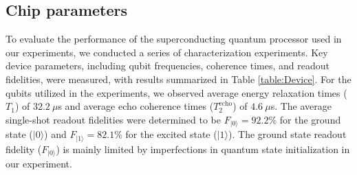 \documentclass[aps,prl,epsfigure,twocolumn,superscriptaddress]{revtex4-2}
\newcommand{\1}{\mathbbm{1}}
\begin{document}
\subsection{Chip parameters}

To evaluate the performance of the superconducting quantum processor used in our experiments, we conducted a series of characterization experiments. Key device parameters, including qubit frequencies, coherence times, and readout fidelities, were measured, with results summarized in Table \ref{table:Device}. For the qubits utilized in the experiments, we observed average energy relaxation times ($T_1$) of $32.2~\mu$s and average echo coherence times ($T_2^{\text{echo}}$) of $4.6~\mu$s. The average single-shot readout fidelities were determined to be $F_{|0\rangle} = 92.2\%$ for the ground state ($|0\rangle$) and $F_{|1\rangle} = 82.1\%$ for the excited state ($|1\rangle$). The ground state readout fidelity ($F_{|0\rangle}$) is mainly limited by imperfections in quantum state initialization in our experiment.
\end{document}
